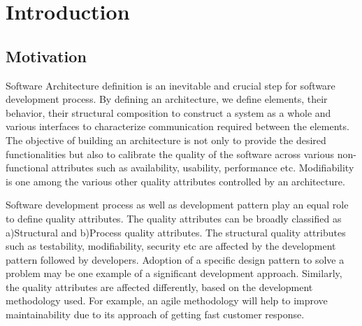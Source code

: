 \chapter{Introduction}\label{chapter:introduction}

\section{Motivation}\label{section:introduction/motivation}
Software Architecture definition is an inevitable and crucial step for software development process. By defining an architecture, we define elements, their behavior, their structural composition to construct a system as a whole and various interfaces to characterize communication required between the elements. \cite{microsoft1501} The objective of building an architecture is not only to provide the desired functionalities but also to calibrate the quality of the software across various non-functional attributes such as availability, usability, performance etc. Modifiability is one among the various other quality attributes controlled by an architecture. \cite{Wesley0301}


Software development process as well as development pattern play an equal role to define quality attributes. The quality attributes can be broadly classified as a)Structural and b)Process quality attributes. The structural quality attributes such as testability, modifiability, security etc are affected by the development pattern followed by developers. Adoption of a specific design pattern to solve a problem may be one example of a significant development approach. Similarly, the quality attributes are affected differently, based on the development methodology used. For example, an agile methodology will help to improve maintainability due to its approach of getting fast customer response.\cite{Chappell01}

